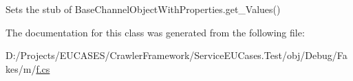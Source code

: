 Sets the stub of Base\-Channel\-Object\-With\-Properties.\-get\-\_\-\-Values()



The documentation for this class was generated from the following file\-:\begin{DoxyCompactItemize}
\item 
D\-:/\-Projects/\-E\-U\-C\-A\-S\-E\-S/\-Crawler\-Framework/\-Service\-E\-U\-Cases.\-Test/obj/\-Debug/\-Fakes/m/\hyperlink{m_2f_8cs}{f.\-cs}\end{DoxyCompactItemize}
